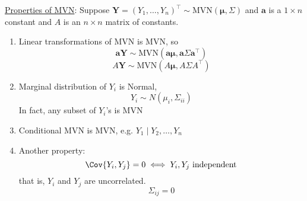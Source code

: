\underline{Properties of MVN}:
Suppose $ \symbf{Y}=(Y_1,\ldots,Y_n)^\top \sim \text{MVN}(\symbf{\mu},\Sigma) $
and $ \symbf{a} $ is a $ 1\times n $ constant
and $ A $ is an $ n\times n  $ matrix of constants.
\begin{enumerate}
    \item Linear transformations of MVN is MVN, so
          \[ \symbf{a}\symbf{Y}\sim \text{MVN}(\symbf{a}\symbf{\mu},\symbf{a}
              \Sigma\symbf{a}^\top) \]
          \[ A\symbf{Y} \sim \text{MVN}(A\symbf{\mu},A\Sigma A^\top) \]
    \item Marginal distribution of $ Y_i $ is
          Normal,
          \[ Y_i \sim N(\mu_i,\Sigma_{ii}) \]
          In fact, any subset of $ Y_i $'s is MVN
    \item Conditional MVN is MVN, e.g. $ Y_1\mid Y_2,\ldots,Y_n $
    \item Another property:
          \[ \Cov{Y_i,Y_j}=0\iff Y_i,Y_j\text{ independent} \]
          that is, $ Y_i $ and $ Y_j $ are uncorrelated.
          \[ \Sigma_{ij}=0 \]

\end{enumerate}
